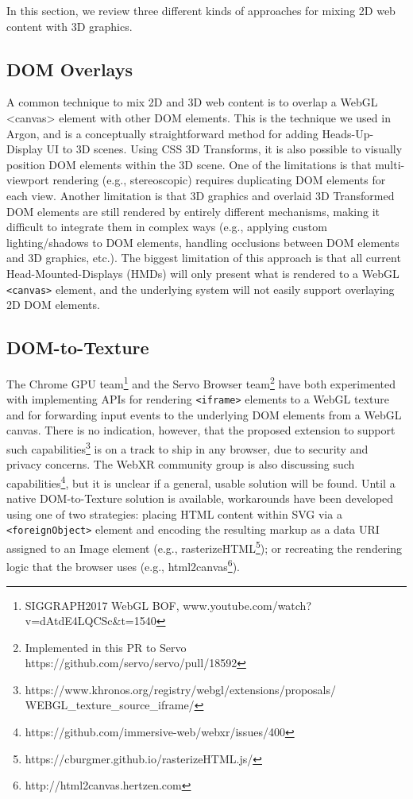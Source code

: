 \documentclass[sigconf]{acmart}
\begin{document}
In this section, we review three different kinds of approaches for mixing 2D web content with 3D graphics. 

\subsection{DOM Overlays}
\label{sec:dom-overlays}

A common technique to mix 2D and 3D web content is to overlap a WebGL <canvas> element with other DOM elements. This is the technique we used in Argon, and is a conceptually straightforward method for adding Heads-Up-Display UI to 3D scenes. Using CSS 3D Transforms, it is also possible to visually position DOM elements within the 3D scene.
One of the limitations is that multi-viewport rendering (e.g., stereoscopic) requires duplicating DOM elements for each view. Another limitation is that 3D graphics and overlaid 3D Transformed DOM elements are still rendered by entirely different mechanisms, making it difficult to integrate them in complex ways (e.g., applying custom lighting/shadows to DOM elements, handling occlusions between DOM elements and 3D graphics, etc.). The biggest limitation of this approach is that all current Head-Mounted-Displays (HMDs) will only present what is rendered to a WebGL \verb|<canvas>| element, and the underlying system will not easily support overlaying 2D DOM elements.

\subsection{DOM-to-Texture}

The Chrome GPU team\footnote{SIGGRAPH2017 WebGL BOF, www.youtube.com/watch?v=dAtdE4LQCSc\&t=1540} and the Servo Browser team\footnote{Implemented in this PR to Servo https://github.com/servo/servo/pull/18592} have both experimented with implementing APIs for rendering \verb|<iframe>| elements to a WebGL texture and for forwarding input events to the underlying DOM elements from a WebGL canvas. There is no indication, however, that the proposed extension to support such capabilities\footnote{https://www.khronos.org/registry/webgl/extensions/proposals/ WEBGL\_texture\_source\_iframe/} is on a track to ship in any browser, due to security and privacy concerns.  The WebXR community group is also discussing such capabilities\footnote{https://github.com/immersive-web/webxr/issues/400}, but it is unclear if a general, usable solution will be found. 
Until a native DOM-to-Texture solution is available, workarounds have been developed using one of two strategies: placing HTML content within SVG via a \verb|<foreignObject>| element and encoding the resulting markup as a data URI assigned to an Image element (e.g., rasterizeHTML\footnote{https://cburgmer.github.io/rasterizeHTML.js/}); or recreating the rendering logic that the browser uses (e.g., html2canvas\footnote{http://html2canvas.hertzen.com}). 
\end{document}
